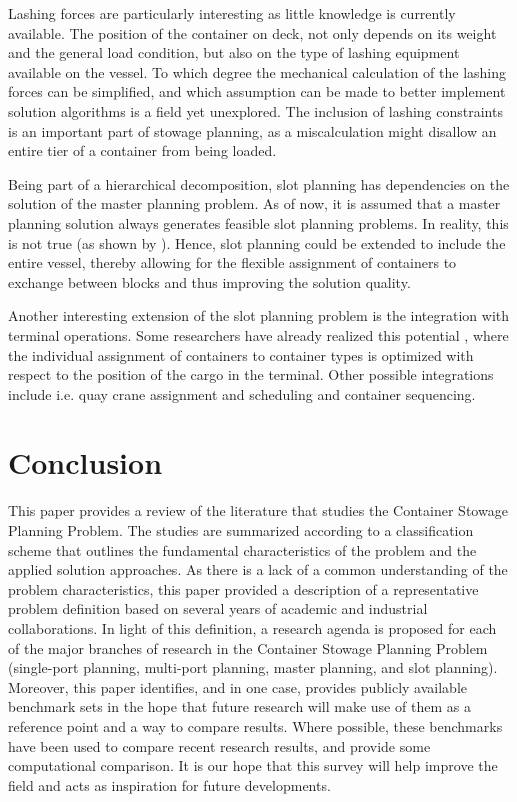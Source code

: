 \documentclass[preprint,12pt,authoryear]{elsarticle}
\begin{document}
Lashing forces are particularly interesting as little knowledge is currently available. The position of the container on deck, not only depends on its weight and the general load condition, but also on the type of lashing equipment available on the vessel. To which degree the mechanical calculation of the lashing forces can be simplified, and which assumption can be made to better implement solution algorithms is a field yet unexplored. The inclusion of lashing constraints is an important part of stowage planning, as a miscalculation might disallow an entire tier of a container from being loaded.

Being part of a hierarchical decomposition, slot planning has dependencies on the solution of the master planning problem. As of now, it is assumed that a master planning solution always generates feasible slot planning problems. In reality, this is not true (as shown by \cite{Pacino2011FastVessels}). Hence, slot planning could be extended to include the entire vessel, thereby allowing for the flexible assignment of containers to exchange between blocks and thus improving the solution quality. %

Another interesting extension of the slot planning problem is the integration with terminal operations. Some researchers have already realized this potential \citep{Monaco2014TheProblem, Iris2018FlexibleScheduling}, where the individual assignment of containers to container types is optimized with respect to the position of the cargo in the terminal. Other possible integrations include i.e. quay crane assignment and scheduling and container sequencing.
\section{Conclusion}
\label{sec:conclusion}
This paper provides a review of the literature that studies the Container Stowage Planning Problem. The studies are summarized according to a classification scheme that outlines the fundamental characteristics of the problem and the applied solution approaches. As there is a lack of a common understanding of the problem characteristics, this paper provided a description of a representative problem definition based on several years of academic and industrial collaborations. In light of this definition, a research agenda is proposed for each of the major branches of research in the Container Stowage Planning Problem (single-port planning, multi-port planning, master planning, and slot planning). Moreover, this paper identifies, and in one case, provides publicly available benchmark sets in the hope that future research will make use of them as a reference point and a way to compare results. Where possible, these benchmarks have been used to compare recent research results, and provide some computational comparison. It is our hope that this survey will help improve the field and acts as inspiration for future developments.
\end{document}
